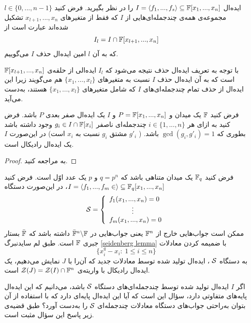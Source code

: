 \begin{definition}
	ایده‌ال 
	$I = \langle f_{1},...,f_{s}\rangle\subseteq \mathbb{F}[x_{1},...,x_{n}]$
	را در نظر بگیرید. فرض کنید 
	$l\in\{0,..., n-1\}$
	مجموعه‌ی همه‌ی چندجمله‌ای‌هایی از 
	$I$
	که فقط از متغیرهای 
	$x_{l+1},...,x_{n}$
	تشکیل شده‌اند عبارت است از
	$$I_{l} = I\cap\mathbb{F}[x_{l+1},...,x_{n}]$$
	که به آن 
	$l$
	امین ایده‌ال حذف 
	$I$
	می‌گوییم.
\end{definition}
با توجه به تعریف ایده‌ال حذف نتیجه می‌شود که 
$I_{l}$
ایده‌الی از حلقه‌ی 
$\mathbb{F}[x_{l+1},...,x_{n}]$
است که به آن ایده‌ال حذف 
$I$
نسبت به متغیرهای 
$\{x_{1},...,x_{l}\}$
هم می‌گویند زیرا این ایده‌ال از حذف تمام چندجمله‌ای‌های
$I$
که شامل متغیرهای 
$\{x_{1},...,x_{l}\}$
هستند، به‌دست  می‌آید. 
\begin{proposition}
	\label{seidenberg lemma}	
	فرض کنید 
	$\mathbb{F}$
	یک میدان و 
	$P = \mathbb{F}[x_{1},...,x_{n}]$
	و
	$I$
	یک ایده‌ال صفر بعدی 
	$P$
	باشد. فرض کنید به ازای هر 
	$i\in\{1,...,n\}$
	چندجمله‌ای ناصفر 
	$g_{i}\in I\cap \mathbb{F}[x_{i}]$
	وجود داشته باشد بطوری که 
	$\gcd(g_{i},g'_{i}) = 1$
	باشد. (
	$g'_{i}$
	مشتق 
	$g_{i}$
	نسبت به 
	$x_{i}$
	است) در این‌صورت 
	$I$
	یک ایده‌ال رادیکال است.
\end{proposition}
\begin{proof}
	به 
	\cite[ص.۲۵۱]{IVAcox}
	مراجعه کنید.
\end{proof}
فرض کنید 
$\mathbb{F}_{q}$
یک میدان متناهی باشد که 
$q = p^{n}$
و
$p$
یک عدد اوّل است. فرض کنید 
{\small $I = \langle f_{1},...,f_{m}\in\rangle\subseteq\mathbb{F}_{q}[x_{1},...,x_{n}]$}،
در این‌صورت دستگاه 
\begin{align*}
{\mathcal S} = \left\{
\begin{array}{lr}
f_{1}(x_{1},...,x_{n}) = 0\\
\ \ \ \ \ \ \ \ \  \ \vdots\\
f_{m}(x_{1},...,x_{n}) = 0	
\end{array}\right.
\end{align*}
ممکن است جواب‌هایی خارج از 
$\mathbb{F}^{n}$
یعنی جواب‌هایی در 
$\bar{\mathbb{F}}^{n}\backslash\mathbb{F}$
داشته باشد که 
$\bar{\mathbb{F}}$
بستار جبری 
$\mathbb{F}$
است. طبق لم سایدنبرگ
\ref{seidenberg lemma}
با ضمیمه کردن معادلات 
$$\{x_{i}^{q} - x_{i}: \ 1\leq i\leq n\}$$
به دستگاه 
${\mathcal S}$
، ایده‌ال تولید شده توسط معادلات جدید که آن‌را با 
$J$
نمایش می‌دهیم، یک ایده‌ال رادیکال با واریته‌ی 
${\mathcal Z}(J) = {\mathcal Z}(I)\cap \mathbb{F}^{n}$
است. 

اگر
$I$
ایده‌ال تولید شده توسط چندجمله‌ای‌های دستگاه 
${\mathcal S}$
باشد، می‌دانیم که این ایده‌ال پایه‌های متفاوتی دارد، سؤال این است که آیا این ایده‌ال پایه‌ای دارد که با استفاده از آن بتوان به‌راحتی جواب‌های دستگاه معادلات چندجمله‌ای 
${\mathcal S}$
را به‌دست  آورد؟  طبق قضیه‌ی زیر پاسخ این سؤال مثبت است.

